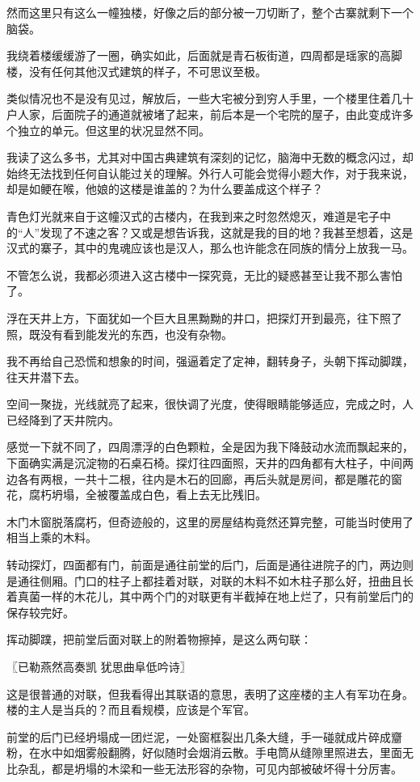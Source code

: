 然而这里只有这么一幢独楼，好像之后的部分被一刀切断了，整个古寨就剩下一个脑袋。

我绕着楼缓缓游了一圈，确实如此，后面就是青石板街道，四周都是瑶家的高脚楼，没有任何其他汉式建筑的样子，不可思议至极。

类似情况也不是没有见过，解放后，一些大宅被分到穷人手里，一个楼里住着几十户人家，后面院子的通道就被堵了起来，前后本是一个宅院的屋子，由此变成许多个独立的单元。但这里的状况显然不同。

我读了这么多书，尤其对中国古典建筑有深刻的记忆，脑海中无数的概念闪过，却始终无法找到任何自认能过关的理解。外行人可能会觉得小题大作，对于我来说，却是如鲠在喉，他娘的这楼是谁盖的？为什么要盖成这个样子？

青色灯光就来自于这幢汉式的古楼内，在我到来之时忽然熄灭，难道是宅子中的“人”发现了不速之客？又或是想告诉我，这就是我的目的地？我甚至想着，这是汉式的寨子，其中的鬼魂应该也是汉人，那么也许能念在同族的情分上放我一马。

不管怎么说，我都必须进入这古楼中一探究竟，无比的疑惑甚至让我不那么害怕了。

浮在天井上方，下面犹如一个巨大且黑黝黝的井口，把探灯开到最亮，往下照了照，既没有看到能发光的东西，也没有杂物。

我不再给自己恐慌和想象的时间，强逼着定了定神，翻转身子，头朝下挥动脚蹼，往天井潜下去。

空间一聚拢，光线就亮了起来，很快调了光度，使得眼睛能够适应，完成之时，人已经降到了天井院内。

感觉一下就不同了，四周漂浮的白色颗粒，全是因为我下降鼓动水流而飘起来的，下面确实满是沉淀物的石桌石椅。探灯往四面照，天井的四角都有大柱子，中间两边各有两根，一共十二根，往内是木石的回廊，再后头就是房间，都是雕花的窗花，腐朽坍塌，全被覆盖成白色，看上去无比残旧。

木门木窗脱落腐朽，但奇迹般的，这里的房屋结构竟然还算完整，可能当时使用了相当上乘的木料。

转动探灯，四面都有门，前面是通往前堂的后门，后面是通往进院子的门，两边则是通往侧厢。门口的柱子上都挂着对联，对联的木料不如木柱子那么好，扭曲且长着真菌一样的木花儿，其中两个门的对联更有半截掉在地上烂了，只有前堂后门的保存较完好。

挥动脚蹼，把前堂后面对联上的附着物擦掉，是这么两句联：

〖已勒燕然高奏凯
犹思曲阜低吟诗〗

这是很普通的对联，但我看得出其联语的意思，表明了这座楼的主人有军功在身。楼的主人是当兵的？而且看规模，应该是个军官。

前堂的后门已经坍塌成一团烂泥，一处窗框裂出几条大缝，手一碰就成片碎成齏粉，在水中如烟雾般翻腾，好似随时会烟消云散。手电筒从缝隙里照进去，里面无比杂乱，都是坍塌的木梁和一些无法形容的杂物，可见内部被破坏得十分厉害。


